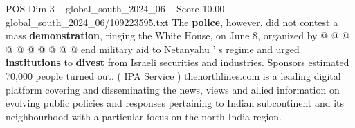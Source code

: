 \begin{textsample}{POS Dim 3 – global\_south\_2024\_06 – Score 10.00 – global\_south\_2024\_06/109223595.txt}
The \textbf{police}, however, did not contest a mass \textbf{demonstration}, ringing the White House, on June 8, organized by @ @ @ @ @ @ @ @ @ @ end military aid to Netanyahu ' s regime and urged \textbf{institutions} to \textbf{divest} from Israeli securities and industries.
Sponsors estimated 70,000 people turned out. ( IPA Service ) thenorthlines.com is a leading digital platform covering and disseminating the news, views and allied information on evolving public policies and responses pertaining to Indian subcontinent and its neighbourhood with a particular focus on the north India region.

\end{textsample}
